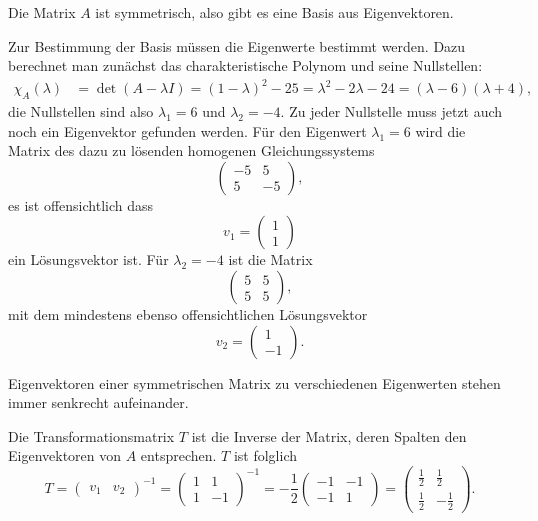 \begin{loesung}
\begin{teilaufgaben}
\item
Die Matrix $A$ ist symmetrisch, also gibt es eine Basis aus
Eigenvektoren.
\item
Zur Bestimmung der Basis müssen die Eigenwerte bestimmt werden.
Dazu berechnet man zunächst das charakteristische Polynom und
seine Nullstellen:
\begin{align*}
\chi_A(\lambda)
&=\det(A-\lambda I)=(1-\lambda)^2-25=\lambda^2-2\lambda -24
=(\lambda-6)(\lambda +4),
\end{align*}
die Nullstellen sind also $\lambda_1=6$ und $\lambda_2=-4$. Zu jeder
Nullstelle muss jetzt auch noch ein Eigenvektor gefunden werden.
Für den Eigenwert $\lambda_1=6$ wird die Matrix des dazu zu lösenden
homogenen Gleichungssystems
\[
\begin{pmatrix}-5&5\\5&-5\end{pmatrix},
\]
es ist offensichtlich dass
\[
v_1=\begin{pmatrix}1\\1\end{pmatrix}
\]
ein Lösungsvektor ist. Für $\lambda_2=-4$ ist die Matrix
\[
\begin{pmatrix}5&5\\5&5\end{pmatrix},
\]
mit dem mindestens ebenso offensichtlichen Lösungsvektor
\[
v_2=\begin{pmatrix}1\\-1\end{pmatrix}.
\]
\item
Eigenvektoren einer symmetrischen Matrix zu verschiedenen Eigenwerten
stehen immer senkrecht aufeinander.
\item Die Transformationsmatrix $T$ ist die Inverse der Matrix, deren Spalten den Eigenvektoren von $A$ entsprechen. $T$ ist folglich
\[
    T = \begin{pmatrix}v_1 & v_2 \end{pmatrix}^{-1} = \begin{pmatrix}1 & 1\\ 1 & -1 \end{pmatrix}^{-1} = -\dfrac{1}{2}\begin{pmatrix}-1 & -1\\ -1 & 1 \end{pmatrix} = \begin{pmatrix}\frac{1}{2} & \frac{1}{2}\\ \frac{1}{2} & -\frac{1}{2} \end{pmatrix}.
\]
\end{teilaufgaben}
\end{loesung}
